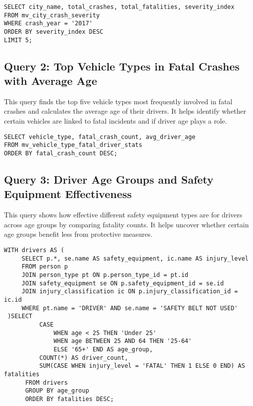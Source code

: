 \documentclass[12pt]{article}
\begin{document}
{\scriptsize
\begin{verbatim}
SELECT city_name, total_crashes, total_fatalities, severity_index
FROM mv_city_crash_severity 
WHERE crash_year = '2017'
ORDER BY severity_index DESC
LIMIT 5;
\end{verbatim}}

\subsection{Query 2: Top Vehicle Types in Fatal Crashes with Average Age}

This query finds the top five vehicle types most frequently involved in fatal crashes and calculates the average age of their drivers. It helps identify whether certain vehicles are linked to fatal incidents and if driver age plays a role.

{\scriptsize
\begin{verbatim}
SELECT vehicle_type, fatal_crash_count, avg_driver_age
FROM mv_vehicle_type_fatal_driver_stats 
ORDER BY fatal_crash_count DESC;
\end{verbatim}}



\subsection{Query 3: Driver Age Groups and Safety Equipment Effectiveness}

This query shows how effective different safety equipment types are for drivers across age groups by comparing fatality counts. It helps uncover whether certain age groups benefit less from protective measures.

{\scriptsize
\begin{verbatim}
WITH drivers AS (
     SELECT p.*, se.name AS safety_equipment, ic.name AS injury_level
     FROM person p
     JOIN person_type pt ON p.person_type_id = pt.id
     JOIN safety_equipment se ON p.safety_equipment_id = se.id
     JOIN injury_classification ic ON p.injury_classification_id = ic.id
     WHERE pt.name = 'DRIVER' AND se.name = 'SAFETY BELT NOT USED'
 )SELECT
          CASE
              WHEN age < 25 THEN 'Under 25'
              WHEN age BETWEEN 25 AND 64 THEN '25-64'
              ELSE '65+' END AS age_group,
          COUNT(*) AS driver_count,
          SUM(CASE WHEN injury_level = 'FATAL' THEN 1 ELSE 0 END) AS fatalities
      FROM drivers
      GROUP BY age_group
      ORDER BY fatalities DESC;
\end{verbatim}}
\end{document}
